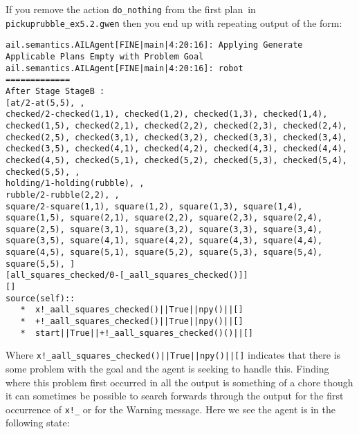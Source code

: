 \begin{sloppypar}
If you remove the action \texttt{do\_nothing} from the first plan\ in
\texttt{pickuprubble\_ex5.2.gwen} then you
end up with repeating output of the form: 
\end{sloppypar}

\begin{verbatim}
ail.semantics.AILAgent[FINE|main|4:20:16]: Applying Generate Applicable Plans Empty with Problem Goal 
ail.semantics.AILAgent[FINE|main|4:20:16]: robot
=============
After Stage StageB :
[at/2-at(5,5), , 
checked/2-checked(1,1), checked(1,2), checked(1,3), checked(1,4), checked(1,5), checked(2,1), checked(2,2), checked(2,3), checked(2,4), checked(2,5), checked(3,1), checked(3,2), checked(3,3), checked(3,4), checked(3,5), checked(4,1), checked(4,2), checked(4,3), checked(4,4), checked(4,5), checked(5,1), checked(5,2), checked(5,3), checked(5,4), checked(5,5), , 
holding/1-holding(rubble), , 
rubble/2-rubble(2,2), , 
square/2-square(1,1), square(1,2), square(1,3), square(1,4), square(1,5), square(2,1), square(2,2), square(2,3), square(2,4), square(2,5), square(3,1), square(3,2), square(3,3), square(3,4), square(3,5), square(4,1), square(4,2), square(4,3), square(4,4), square(4,5), square(5,1), square(5,2), square(5,3), square(5,4), square(5,5), ]
[all_squares_checked/0-[_aall_squares_checked()]]
[]
source(self):: 
   *  x!_aall_squares_checked()||True||npy()||[]
   *  +!_aall_squares_checked()||True||npy()||[]
   *  start||True||+!_aall_squares_checked()()||[]
\end{verbatim}

\begin{sloppypar}
Where \texttt{x!\_aall\_squares\_checked()||True||npy()||[]} indicates
that there is some problem with the goal and the
agent is seeking to handle this.  Finding where this problem first
occurred in all the output is something of a chore though it can
sometimes be possible to search forwards through the output for the
first occurrence of \texttt{x!\_}  or for the Warning message.  Here
we see the agent is in the following state: 
\end{sloppypar}

